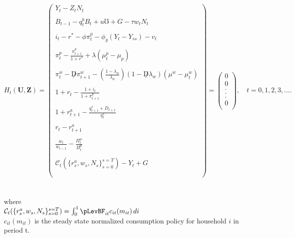 \documentclass[titlepage]{\econtex}\providecommand{\texname}{BufferStockTheory}
\begin{document}
$$
H_{t}(\mathbf{U},\mathbf{Z})= \begin{pmatrix} 
 Y_{t} - Z_{t}N_{t} \\ \\ 
B_{t-1} - q^{b}_{t}B_{t} + u\mho + G - \tau w_{t} N_{t} \\ \\  
i_{t} - r^{*} - \phi \pi^{p}_{t} -\phi_{y}(Y_{t}-Y_{ss}) - v_{t} \\ \\
\pi_{t}^{p} -\frac{\pi^{p}_{t+1}}{1+r^{*}} + \lambda(\mu_{t}^{p} -\mu_{p})  \\ \\
 \pi_{t}^{w} -\not D \pi_{t+1}^{w} -(\frac{1-\lambda_{w}}{\lambda_{w}}) (1- \not D \lambda_{w}) (\mu^{w} -\mu_{t}^{w}) \\ \\
    1+r_{t} - \frac{1 + i_{t}}{1+ \pi^{p}_{t+1}}\\ \\
 1+r_{t+1}^{a} - \frac{q_{t+1}^{s} +D_{t+1}}{q_{t}^{s}} \\ \\
 r_{t} - r_{t+1}^{a} \\ \\
 \frac{w_{t}}{w_{t-1}} - \frac{\Pi_{t}^{w}}{\Pi_{t}^{p}} \\ \\
 \mathcal{C}_{t}(\{r_{s}^{a} ,w_{s}, N_{s}\}_{s=0}^{s=T}) - Y_{t} + G \\ \\
 \end{pmatrix} = \begin{pmatrix} 0 \\ 0 \\. \\. \\. \\ 0\\ \end{pmatrix} , \quad t=0,1 ,2,3,....
$$ \\ \\
 

 
 where \\
 
$\mathcal{C}_{t}(\{r_{s}^{a} ,w_{s}, N_{s}\}_{s=0}^{s=T}) = \int_{0}^{1} \pLevBF_{it} c_{it}(m_{it})\, di $ \\
 
$c_{it}(m_{it})$ is the steady state normalized consumption policy for household $i$ in period t. \\ \\
 
\end{document}
